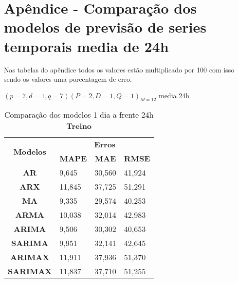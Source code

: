 
\section{Ap\^endice - Compara\c c\~ao dos modelos de previs\~ao de series temporais media de 24h}\label{sec:comtb24}

Nas tabelas do apêndice todos os valores estão multiplicado por 100 com isso sendo os valores uma porcentagem de erro.

$(p = 7,d = 1,q = 7) (P = 2,D = 1,Q = 1)_{M = 12}$ media 24h
	\begin{table}[H]
	\centering
	\caption{Comparação dos modelos 1 dia a frente 24h \textbf{Treino} }\label{tb:1-24trn}
	\begin{tabular}{@{}clll@{}}
		\toprule
		\multirow{2}{*}{\textbf{Modelos}} & \multicolumn{3}{c}{\textbf{Erros}}                                                                       \\ \cmidrule(l){2-4} 
		& \multicolumn{1}{c}{\textbf{MAPE}} & \multicolumn{1}{c}{\textbf{MAE}} & \multicolumn{1}{c}{\textbf{RMSE}} \\ \hline
\textbf{AR}                       & 9,645                             & 30,560                           & 41,924                            \\
\textbf{ARX}                      & 11,845                            & 37,725                           & 51,291                            \\
\textbf{MA}                       & 9,335                             & 29,574                           & 40,253                            \\
\textbf{ARMA}                     & 10,038                            & 32,014                           & 42,983                            \\
\textbf{ARIMA}                    & 9,506                             & 30,302                           & 40,653                            \\
\textbf{SARIMA}                   & 9,951                             & 32,141                           & 42,645                            \\
\textbf{ARIMAX}                   & 11,911                            & 37,936                           & 51,370                            \\
\textbf{SARIMAX}                  & 11,837                            & 37,710                           & 51,255                            \\

\end{tabular}
\end{table}
